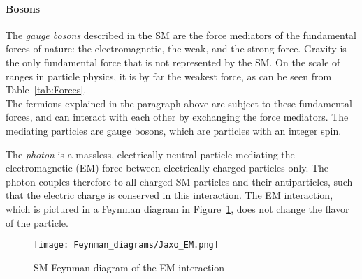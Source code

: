 \paragraph{Bosons}
The \textit{gauge bosons} described in the SM are the force mediators of the fundamental forces of nature:
the electromagnetic, the weak, and the strong force.
Gravity is the only fundamental force that is not represented by the SM.
On the scale of ranges in particle physics, it is by far the weakest force, as can be seen from Table~\ref{tab:Forces}.
\\The fermions explained in the paragraph above are subject to these fundamental forces, and can interact with each other by exchanging the force mediators.
The mediating particles are gauge bosons, which are particles with an integer spin.\\
\begin{minipage}{0.55\textwidth}
The \textit{photon} is a massless, electrically neutral particle mediating the electromagnetic (EM) force between electrically charged particles only.
The photon couples therefore to all charged SM particles and their antiparticles, such that the electric charge is conserved in this interaction.
The EM interaction, which is pictured in a Feynman diagram in Figure~\ref{fig:Feynman:EM}, does not change the flavor of the particle.
\end{minipage} \hfill
\begin{minipage}{0.4\textwidth}
\centering
\begin{figure}[H]\centering
\texttt{[image: Feynman\_diagrams/Jaxo\_EM.png]}
\caption{SM Feynman diagram of the EM interaction}
\label{fig:Feynman:EM} 
\end{figure}
\end{minipage}

